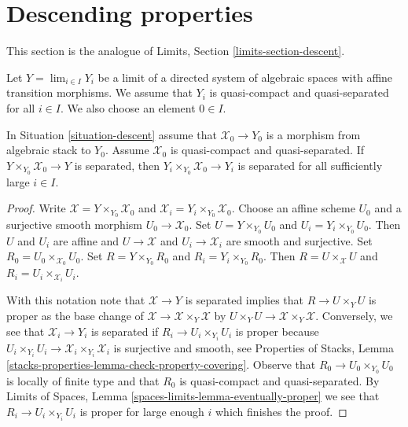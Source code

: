 \section{Descending properties}
\label{section-descent}

\noindent
This section is the analogue of Limits, Section \ref{limits-section-descent}.

\begin{situation}
\label{situation-descent}
Let $Y = \lim_{i \in I} Y_i$ be a limit of a directed
system of algebraic spaces with affine transition morphisms.
We assume that $Y_i$ is quasi-compact and quasi-separated for all $i \in I$.
We also choose an element $0 \in I$.
\end{situation}

\begin{lemma}
\label{lemma-eventually-separated}
In Situation \ref{situation-descent} assume that $\mathcal{X}_0 \to Y_0$
is a morphism from algebraic stack to $Y_0$. Assume $\mathcal{X}_0$
is quasi-compact and quasi-separated.
If $Y \times_{Y_0} \mathcal{X}_0 \to Y$ is separated, then
$Y_i \times_{Y_0} \mathcal{X}_0 \to Y_i$ is separated for all
sufficiently large $i \in I$.
\end{lemma}

\begin{proof}
Write $\mathcal{X} = Y \times_{Y_0} \mathcal{X}_0$ and
$\mathcal{X}_i = Y_i \times_{Y_0} \mathcal{X}_0$.
Choose an affine scheme $U_0$ and a surjective smooth morphism
$U_0 \to \mathcal{X}_0$. Set $U = Y \times_{Y_0} U_0$
and $U_i = Y_i \times_{Y_0} U_0$. Then $U$ and $U_i$ are
affine and $U \to \mathcal{X}$ and $U_i \to \mathcal{X}_i$
are smooth and surjective. Set $R_0 = U_0 \times_{\mathcal{X}_0} U_0$.
Set $R = Y \times_{Y_0} R_0$ and $R_i = Y_i \times_{Y_0} R_0$.
Then $R = U \times_\mathcal{X} U$ and $R_i = U_i \times_{\mathcal{X}_i} U_i$.

\medskip\noindent
With this notation note that $\mathcal{X} \to Y$ is separated
implies that $R \to U \times_Y U$ is proper as the base change
of $\mathcal{X} \to \mathcal{X} \times_Y \mathcal{X}$
by $U \times_Y U \to \mathcal{X} \times_Y \mathcal{X}$.
Conversely, we see that $\mathcal{X}_i \to Y_i$ is separated
if $R_i \to U_i \times_{Y_i} U_i$ is proper because
$U_i \times_{Y_i} U_i \to \mathcal{X}_i \times_{Y_i} \mathcal{X}_i$
is surjective and smooth, see
Properties of Stacks, Lemma
\ref{stacks-properties-lemma-check-property-covering}.
Observe that $R_0 \to U_0 \times_{Y_0} U_0$
is locally of finite type and that $R_0$ is
quasi-compact and quasi-separated.
By Limits of Spaces, Lemma \ref{spaces-limits-lemma-eventually-proper}
we see that $R_i \to U_i \times_{Y_i} U_i$ is
proper for large enough $i$ which finishes the proof.
\end{proof}








